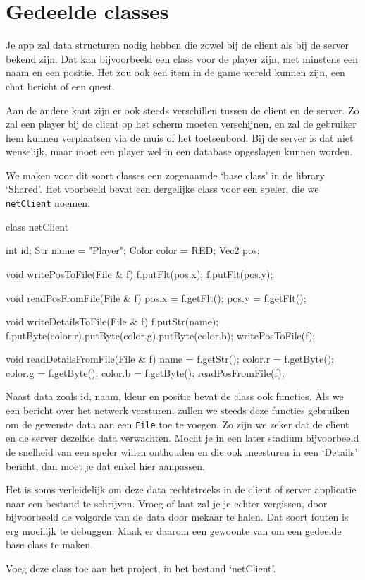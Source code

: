 \section{Gedeelde classes}
Je app zal data structuren nodig hebben die zowel bij de client als bij de server bekend zijn. Dat kan bijvoorbeeld een class voor de player zijn, met minstens een naam en een positie. Het zou ook een item in de game wereld kunnen zijn, een chat bericht of een quest. 

Aan de andere kant zijn er ook steeds verschillen tussen de client en de server. Zo zal een player bij de client op het scherm moeten verschijnen, en zal de gebruiker hem kunnen verplaatsen via de muis of het toetsenbord. Bij de server is dat niet wenselijk, maar moet een player wel in een database opgeslagen kunnen worden.

We maken voor dit soort classes een zogenaamde `base class' in de library `Shared'. Het voorbeeld bevat een dergelijke class voor een speler, die we \texttt{netClient} noemen:

\begin{code}
class netClient
{
   int id;
   Str name = "Player";
   Color color = RED;
   Vec2 pos;

   void writePosToFile(File & f)
   {
      f.putFlt(pos.x);
      f.putFlt(pos.y);
   }
   
   void readPosFromFile(File & f)
   {
      pos.x = f.getFlt();
      pos.y = f.getFlt();
   }
      
   void writeDetailsToFile(File & f)
   {
      f.putStr(name);
      f.putByte(color.r).putByte(color.g).putByte(color.b);
      writePosToFile(f);
   }
   
   void readDetailsFromFile(File & f)
   {
      name = f.getStr();
      color.r = f.getByte(); color.g = f.getByte(); color.b = f.getByte();
      readPosFromFile(f);
   }
}
\end{code}

Naast data zoals id, naam, kleur en positie bevat de class ook functies. Als we een bericht over het netwerk versturen, zullen we steeds deze functies gebruiken om de gewenste data aan een \texttt{File} toe te voegen. Zo zijn we zeker dat de client en de server dezelfde data verwachten. Mocht je in een later stadium bijvoorbeeld de snelheid van een speler willen onthouden en die ook meesturen in een `Details' bericht, dan moet je dat enkel hier aanpassen. 

\begin{note}
Het is soms verleidelijk om deze data rechtstreeks in de client of server applicatie naar een bestand te schrijven. Vroeg of laat zal je je echter vergissen, door bijvoorbeeld de volgorde van de data door mekaar te halen. Dat soort fouten is erg moeilijk te debuggen. Maak er daarom een gewoonte van om een gedeelde base class te maken. 
\end{note}

\begin{exercise}
Voeg deze class toe aan het project, in het bestand `netClient'.
\end{exercise}
